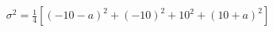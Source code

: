 \documentclass[preview]{standalone}
\begin{document}
\begin{align*}
\sigma^2 = \frac{1}{4}[(-10-a)^2 + (-10)^2 + 10^2 + (10+a)^2]
\end{align*}
\end{document}
